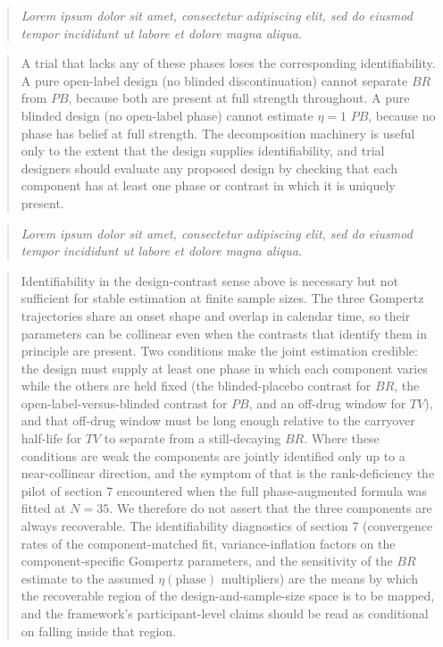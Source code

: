 \documentclass[
  11pt,
]{article}
\newenvironment{rgt}{%
  \begin{quote}\small\itshape\color[RGB]{20,60,160}}{%
  \end{quote}}
\newenvironment{orig}{%
  \begin{quote}\normalsize\color[gray]{0.55}}{%
  \end{quote}}
\begin{document}
\begin{rgt}
Lorem ipsum dolor sit amet, consectetur adipiscing elit, sed do eiusmod tempor incididunt ut labore et dolore magna aliqua.

\end{rgt}

\begin{orig}
A trial that lacks any of these phases loses the corresponding
identifiability. A pure open-label design (no blinded
discontinuation) cannot separate \(BR\) from \(PB\), because both
are present at full strength throughout. A pure blinded design
(no open-label phase) cannot estimate \(\eta = 1\) \(PB\), because
no phase has belief at full strength. The decomposition
machinery is useful only to the extent that the design supplies
identifiability, and trial designers should evaluate any
proposed design by checking that each component has at least one
phase or contrast in which it is uniquely present.

\end{orig}

\begin{rgt}
Lorem ipsum dolor sit amet, consectetur adipiscing elit, sed do eiusmod tempor incididunt ut labore et dolore magna aliqua.

\end{rgt}

\begin{orig}
Identifiability in the design-contrast sense above is necessary
but not sufficient for stable estimation at finite sample sizes.
The three Gompertz trajectories share an onset shape and overlap
in calendar time, so their parameters can be collinear even when
the contrasts that identify them in principle are present. Two
conditions make the joint estimation credible: the design must
supply at least one phase in which each component varies while
the others are held fixed (the blinded-placebo contrast for
\(BR\), the open-label-versus-blinded contrast for \(PB\), and an
off-drug window for \(TV\)), and that off-drug window must be long
enough relative to the carryover half-life for \(TV\) to separate
from a still-decaying \(BR\). Where these conditions are weak the
components are jointly identified only up to a near-collinear
direction, and the symptom of that is the rank-deficiency the
pilot of section 7 encountered when the full phase-augmented
formula was fitted at \(N = 35\). We therefore do not assert that
the three components are always recoverable. The
identifiability diagnostics of section 7 (convergence rates of
the component-matched fit, variance-inflation factors on the
component-specific Gompertz parameters, and the sensitivity of
the \(BR\) estimate to the assumed \(\eta(\text{phase})\) multipliers)
are the means by which the recoverable region of the
design-and-sample-size space is to be mapped, and the
framework's participant-level claims should be read as
conditional on falling inside that region.

\end{orig}
\end{document}
